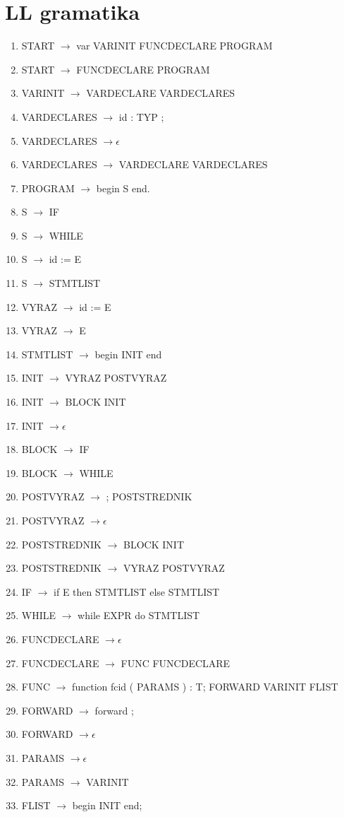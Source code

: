 \documentclass[a4paper]{article}
\begin{document}
\newpage
\section{LL gramatika}
\begin{enumerate}
\item{START $\rightarrow $ var VARINIT FUNCDECLARE PROGRAM}
\item{START $\rightarrow $ FUNCDECLARE PROGRAM}
\item{VARINIT $\rightarrow $ VARDECLARE VARDECLARES } 
\item{VARDECLARES $\rightarrow $ id : TYP ; } 
\item{VARDECLARES $\rightarrow \epsilon$ } 
\item{VARDECLARES $\rightarrow$ VARDECLARE VARDECLARES } 
\item{PROGRAM $\rightarrow$ begin S end. } 
\item{S $\rightarrow$ IF } 
\item{S $\rightarrow$ WHILE } 
\item{S $\rightarrow$ id := E } 
\item{S $\rightarrow$ STMTLIST } 
\item{VYRAZ $\rightarrow$ id := E } 
\item{VYRAZ $\rightarrow$ E } 
\item{STMTLIST $\rightarrow$ begin INIT end } 
\item{INIT $\rightarrow$ VYRAZ POSTVYRAZ } 
\item{INIT $\rightarrow$ BLOCK INIT } 
\item{INIT $\rightarrow \epsilon$ } 
\item{BLOCK $\rightarrow$ IF } 
\item{BLOCK $\rightarrow$ WHILE }  
\item{POSTVYRAZ $\rightarrow$ ; POSTSTREDNIK } 
\item{POSTVYRAZ $\rightarrow \epsilon$  } 
\item{POSTSTREDNIK $\rightarrow$ BLOCK INIT } 
\item{POSTSTREDNIK $\rightarrow$ VYRAZ POSTVYRAZ } 
\item{IF $\rightarrow$ if E then STMTLIST else STMTLIST } 
\item{WHILE $\rightarrow$ while EXPR do STMTLIST } 
\item{FUNCDECLARE $\rightarrow \epsilon$ } 
\item{FUNCDECLARE $\rightarrow$ FUNC FUNCDECLARE } 
\item{FUNC $\rightarrow$ function fcid ( PARAMS ) : T; FORWARD VARINIT FLIST } 
\item{FORWARD $\rightarrow$ forward ; } 
\item{FORWARD $\rightarrow \epsilon$ } 
\item{PARAMS $\rightarrow \epsilon$ } 
\item{PARAMS $\rightarrow$ VARINIT } 
\item{FLIST $\rightarrow$ begin INIT end; }
\end{enumerate}
\end{document}
